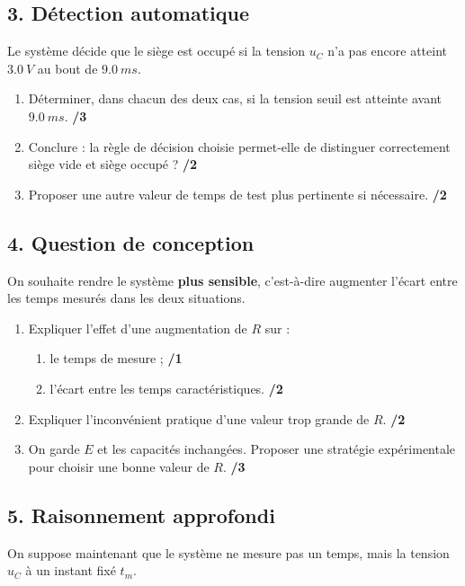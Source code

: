 \documentclass[11pt,a4paper]{article}
\begin{document}
\subsection*{3. Détection automatique}
Le système décide que le siège est occupé si la tension \(u_C\) n'a pas encore atteint \(\SI{3.0}{V}\) au bout de \(\SI{9.0}{ms}\).

\begin{enumerate}
    \item Déterminer, dans chacun des deux cas, si la tension seuil est atteinte avant \(\SI{9.0}{ms}\). \hfill \textbf{/3}
    \item Conclure : la règle de décision choisie permet-elle de distinguer correctement siège vide et siège occupé ? \hfill \textbf{/2}
    \item Proposer une autre valeur de temps de test plus pertinente si nécessaire. \hfill \textbf{/2}
\end{enumerate}

\subsection*{4. Question de conception}
On souhaite rendre le système \textbf{plus sensible}, c'est-à-dire augmenter l'écart entre les temps mesurés dans les deux situations.

\begin{enumerate}
    \item Expliquer l'effet d'une augmentation de \(R\) sur :
    \begin{enumerate}[label=\alph*)]
        \item le temps de mesure ; \hfill \textbf{/1}
        \item l'écart entre les temps caractéristiques. \hfill \textbf{/2}
    \end{enumerate}
    \item Expliquer l'inconvénient pratique d'une valeur trop grande de \(R\). \hfill \textbf{/2}
    \item On garde \(E\) et les capacités inchangées. Proposer une stratégie expérimentale pour choisir une bonne valeur de \(R\). \hfill \textbf{/3}
\end{enumerate}

\subsection*{5. Raisonnement approfondi}
On suppose maintenant que le système ne mesure pas un temps, mais la tension \(u_C\) à un instant fixé \(t_m\).
\end{document}
